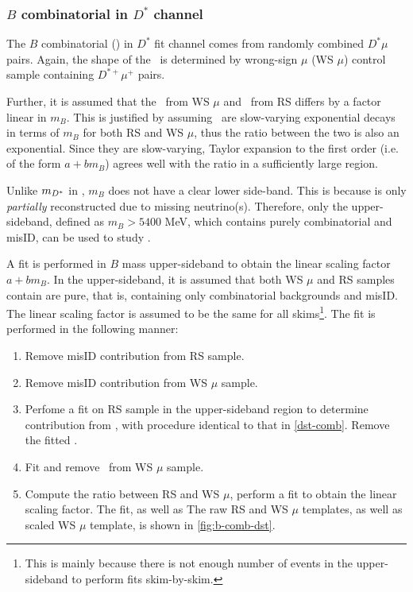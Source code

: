 \subsubsection{$B$ combinatorial in $D^*$ channel}
\label{b-comb-dst}

The $B$ combinatorial (\BComb) in $D^*$ fit channel comes from randomly
combined $D^* \mu$ pairs.
Again, the shape of the \BComb\ is determined by wrong-sign $\mu$ (WS $\mu$)
control sample containing $D^{*+} \mu^+$ pairs.

Further, it is assumed that the \BComb\ from WS $\mu$ and \BComb\ from RS
differs by a factor linear in $m_B$.
This is justified by assuming \BComb\ are slow-varying exponential decays in
terms of $m_B$ for both RS and WS $\mu$, thus the ratio between the two is also
an exponential.
Since they are slow-varying, Taylor expansion to the first order (i.e. of the
form $a + b m_B$) agrees well with the ratio in a sufficiently large region.

Unlike $m_{{D}^*}$ in \DstComb,
$m_B$ does not have a clear lower side-band.
This is because \B is only \emph{partially} reconstructed
due to missing neutrino(s).
Therefore, only the upper-sideband, defined as $m_B > 5400$ MeV,
which contains purely combinatorial and misID, can be used to
study \BComb.

A fit is performed in $B$ mass upper-sideband  to obtain
the linear scaling factor $a + b m_B$.
In the upper-sideband, it is assumed that both WS $\mu$ and RS samples contain
are pure, that is, containing only combinatorial backgrounds and misID.
The linear scaling factor is assumed to be the same for all skims\footnote{
    This is mainly because there is not enough number of events in the
    upper-sideband to perform fits skim-by-skim.
}.
The fit is performed in the following manner:

\begin{enumerate}
    \item Remove misID contribution from RS sample.
    \item Remove misID contribution from WS $\mu$ sample.
    \item Perfome a fit on RS sample in the upper-sideband region to determine
        contribution from \DstComb, with procedure identical to that in
        \cref{dst-comb}. Remove the fitted \DstComb.
    \item Fit and remove \DstComb\ from WS $\mu$ sample.
    \item Compute the ratio between RS and WS $\mu$, perform a fit to obtain
        the linear scaling factor.
        The fit, as well as
        The raw RS and WS $\mu$ templates, as well as scaled WS $\mu$
        template, is shown in \cref{fig:b-comb-dst}.
\end{enumerate}

